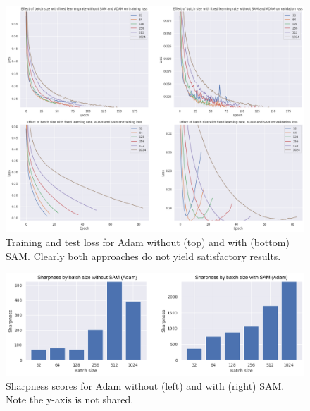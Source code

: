 \documentclass[10pt,conference,compsocconf]{IEEEtran}
\begin{document}
\begin{figure}[htbp]
  \centering
  \includegraphics[width=\columnwidth]{img/figure3_val_loss_with_without_sam_adam}
  \caption{Training and test loss for Adam without (top) and with (bottom) SAM. Clearly both approaches do not yield satisfactory results.}
  \vspace{-3mm}
  \label{fig:adam-val-loss-with-without}
\end{figure}
\begin{figure}[htbp]
  \centering
  \includegraphics[width=\columnwidth]{img/figure4_sharpness_with_without_sam_adam}
  \caption{Sharpness scores for Adam without (left) and with (right) SAM. Note the y-axis is not shared.}
  \vspace{-3mm}
  \label{fig:adam-sharpness-with-without}
\end{figure}
\end{document}
